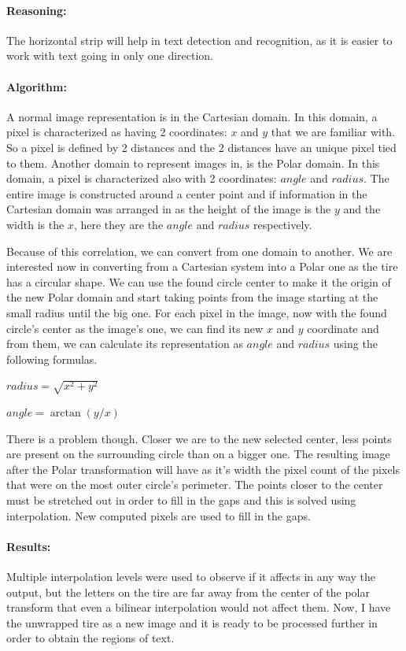 \paragraph*{Reasoning:}\mbox{}\par
The horizontal strip will help in text detection and recognition, as it is easier to work with text going in only one direction.

\paragraph*{Algorithm:}\mbox{}\par
A normal image representation is in the Cartesian domain. In this domain, a pixel is characterized as having 2 coordinates: $x$ and $y$ that we are familiar with. So a pixel is defined by 2 distances and the 2 distances have an unique pixel tied to them.
Another domain to represent images in, is the Polar domain. In this domain, a pixel is characterized also with 2 coordinates: $angle$ and $radius$. The entire image is constructed around a center point and if information in the Cartesian domain was arranged in as the height of the image is the $y$ and the width is the $x$, here they are the $angle$ and $radius$ respectively.

Because of this correlation, we can convert from one domain to another. We are interested now in converting from a Cartesian system into a Polar one as the tire has a circular shape. We can use the found circle center to make it the origin of the new Polar domain and start taking points from the image starting at the small radius until the big one. For each pixel in the image, now with the found circle's center as the image's one, we can find its new $x$ and $y$ coordinate and from them, we can calculate its representation as $angle$ and $radius$ using the following formulas.

$radius = \sqrt{x^2 + y^2}$

$angle = \arctan(y/x)$

There is a problem though. Closer we are to the new selected center, less points are present on the surrounding circle than on a bigger one. The resulting image after the Polar transformation will have as it's width the pixel count of the pixels that were on the most outer circle's perimeter. The points closer to the center must be stretched out in order to fill in the gaps and this is solved using interpolation. New computed pixels are used to fill in the gaps.

\paragraph*{Results:}\mbox{}\par
Multiple interpolation levels were used to observe if it affects in any way the output, but the letters on the tire are far away from the center of the polar transform that even a bilinear interpolation would not affect them. Now, I have the unwrapped tire as a new image and it is ready to be processed further in order to obtain the regions of text.


